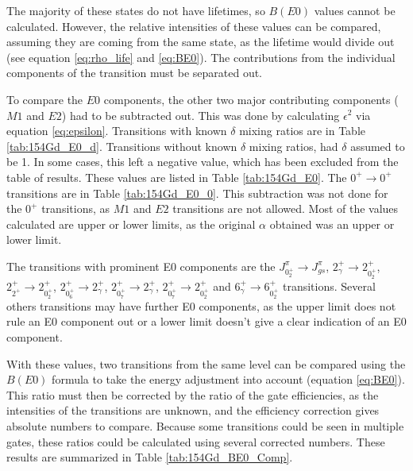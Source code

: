 \afterpage{\clearpage}

The majority of these states do not have lifetimes, so $B(E0)$ values cannot be calculated. However, the relative intensities of these values can be compared, assuming they are coming from the same state, as the lifetime would divide out (see equation \ref{eq:rho_life} and \ref{eq:BE0}). The contributions from the individual components of the transition must be separated out.

To compare the $E0$ components, the other two major contributing components ($M1$ and $E2$) had to be subtracted out. This was done by calculating $\epsilon^2$ via equation \ref{eq:epsilon}. Transitions with known $\delta$ mixing ratios are in Table \ref{tab:154Gd_E0_d}. Transitions without known $\delta$ mixing ratios, had $\delta$ assumed to be 1. In some cases, this left a negative value, which has been excluded from the table of results. These values are listed in Table \ref{tab:154Gd_E0}. The $0^+\rightarrow0^+$ transitions are in Table \ref{tab:154Gd_E0_0}. This subtraction was not done for the $0^+$ transitions, as $M1$ and $E2$ transitions are not allowed. Most of the values calculated are upper or lower limits, as the original $\alpha$ obtained was an upper or lower limit. 

The transitions with prominent E0 components are the $J^{\pi}_{0^+_{2}}\rightarrow J^{\pi}_{gs}$, $2^{+}_{\gamma}\rightarrow 2^{+}_{0^+_{2}}$, $2^{+}_{2^{+}}\rightarrow 2^{+}_{0^+_{2}}$, $2^{+}_{0^+_{6}}\rightarrow 2^{+}_{\gamma}$, $2^{+}_{0^+_{7}}\rightarrow 2^{+}_{\gamma}$, $2^{+}_{0^+_{7}}\rightarrow 2^{+}_{0^+_{2}}$ and $6^{+}_{\gamma}\rightarrow 6^{+}_{0^+_{2}}$ transitions. Several others transitions may have further E0 components, as the upper limit does not rule an E0 component out or a lower limit doesn't give a clear indication of an E0 component.

With these values, two transitions from the same level can be compared using the $B(E0)$ formula to take the energy adjustment into account (equation \ref{eq:BE0}). This ratio must then be corrected by the ratio of the gate efficiencies, as the intensities of the transitions are unknown, and the efficiency correction gives absolute numbers to compare. Because some transitions could be seen in multiple gates, these ratios could be calculated using several corrected numbers. These results are summarized in Table \ref{tab:154Gd_BE0_Comp}.

\afterpage{\clearpage}

